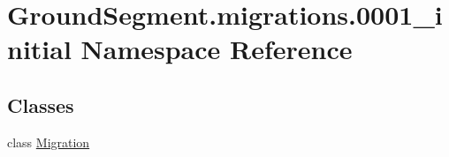 \hypertarget{namespace_ground_segment_1_1migrations_1_10001__initial}{}\section{Ground\+Segment.\+migrations.0001\+\_\+initial Namespace Reference}
\label{namespace_ground_segment_1_1migrations_1_10001__initial}
\subsection*{Classes}
\begin{DoxyCompactItemize}
\item 
class \hyperlink{class_ground_segment_1_1migrations_1_10001__initial_1_1_migration}{Migration}
\end{DoxyCompactItemize}
